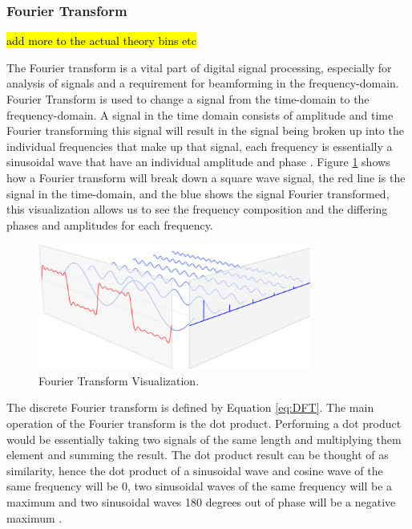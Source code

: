 \documentclass{UoNMCHA}
\numberwithin{equation}{section}
\begin{document}
\subsubsection{Fourier Transform} \label{sec:Fourier Transform}
    \hl{add more to the actual theory bins etc}

    The Fourier transform is a vital part of digital signal processing, especially for analysis of signals and a requirement for beamforming in the frequency-domain. Fourier Transform is used to change a signal from the time-domain to the frequency-domain. A signal in the time domain consists of amplitude and time Fourier transforming this signal will result in the signal being broken up into the individual frequencies that make up that signal, each frequency is essentially a sinusoidal wave that have an individual amplitude and phase \citep{Sch17}. Figure \ref{fig:Fourier Transform} shows how a Fourier transform will break down a square wave signal, the red line is the signal in the time-domain, and the blue shows the signal Fourier transformed, this visualization allows us to see the frequency composition and the differing phases and amplitudes for each frequency.
    
    \begin{figure}[H]
        \centering
        \includegraphics[keepaspectratio, width = 0.8\textwidth]{Figures/FFT.png}
        \caption{Fourier Transform Visualization.}
        \label{fig:Fourier Transform}
    \end{figure}
    
    The discrete Fourier transform is defined by Equation \ref{eq:DFT}. The main operation of the Fourier transform is the dot product. Performing a dot product would be essentially taking two signals of the same length and multiplying them element and summing the result. The dot product result can be thought of as similarity, hence the dot product of a sinusoidal wave and cosine wave of the same frequency will be 0, two sinusoidal waves of the same frequency will be a maximum and two sinusoidal waves 180 degrees out of phase will be a negative maximum \citep{Sch17}. 
    
\end{document}
